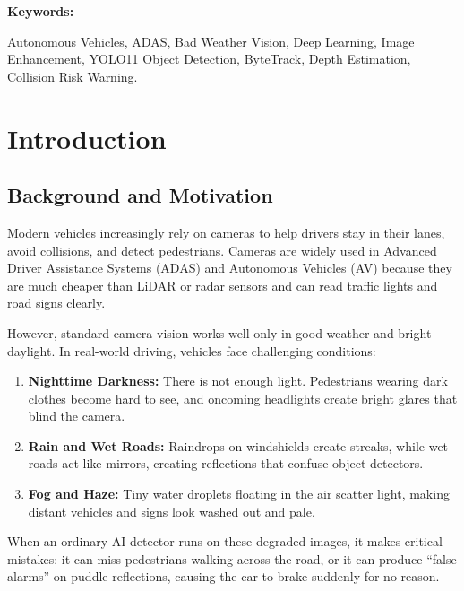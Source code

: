 \documentclass{article}
\newcommand\myemptypage{
    \null
    \thispagestyle{empty}
    \addtocounter{page}{-1}
    \newpage
    }
\begin{document}
\vspace{0.8cm}
\noindent\textbf{Keywords:}
\begin{IEEEkeywords}
Autonomous Vehicles, ADAS, Bad Weather Vision, Deep Learning, Image Enhancement, YOLO11 Object Detection, ByteTrack, Depth Estimation, Collision Risk Warning.
\end{IEEEkeywords}

\newpage
\tableofcontents
\myemptypage
\listoffigures
\listoftables

\renewcommand{\thepage}{\arabic{page}}
\setcounter{page}{1}
\newpage

\section{Introduction}
\label{sec:introduction}

\subsection{Background and Motivation}
Modern vehicles increasingly rely on cameras to help drivers stay in their lanes, avoid collisions, and detect pedestrians. Cameras are widely used in Advanced Driver Assistance Systems (ADAS) and Autonomous Vehicles (AV) because they are much cheaper than LiDAR or radar sensors and can read traffic lights and road signs clearly.

However, standard camera vision works well only in good weather and bright daylight. In real-world driving, vehicles face challenging conditions:
\begin{enumerate}[label=(\alph*)]
    \item \textbf{Nighttime Darkness:} There is not enough light. Pedestrians wearing dark clothes become hard to see, and oncoming headlights create bright glares that blind the camera.
    \item \textbf{Rain and Wet Roads:} Raindrops on windshields create streaks, while wet roads act like mirrors, creating reflections that confuse object detectors.
    \item \textbf{Fog and Haze:} Tiny water droplets floating in the air scatter light, making distant vehicles and signs look washed out and pale.
\end{enumerate}

When an ordinary AI detector runs on these degraded images, it makes critical mistakes: it can miss pedestrians walking across the road, or it can produce ``false alarms'' on puddle reflections, causing the car to brake suddenly for no reason.
\end{document}
